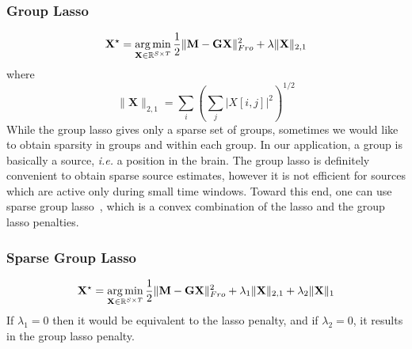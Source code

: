 \subsubsection*{Group Lasso}
\vspace{-10pt}
\begin{equation} \label{eq_glasso}
	\mathbf{X}^\star = \mathop{\mathrm{arg}\,\mathrm{min}}_{\mathbf{X}\in\mathbb{R}^{S\times T}}\frac{1}{2}\|\mathbf{M}-\mathbf{GX}\|_{Fro}^2 + \lambda\|\mathbf{X}\|_{2,1}
\end{equation}
where
\begin{equation*}	\|\mathbf{X}\|_{2,1}=\sum_i\left(\sum_j|X[i,j]|^2\right)^{1/2}
\end{equation*}
\endadjustwidth
While the group lasso gives only a sparse set of groups, sometimes we would like to obtain sparsity in groups and within each group. In our application, a group is basically a source, \textit{i.e.} a position in the brain. The group lasso is definitely convenient to obtain sparse source estimates, however it is not efficient for sources which are active only during small time windows. Toward this end, one can use sparse group lasso~\cite{simon2013sparse}, which is a convex combination of the lasso and the group lasso penalties.
\adjustwidth{1em}{0pt}

\subsubsection*{Sparse Group Lasso}
\begin{equation} \label{eq_sglasso}
	\mathbf{X}^\star = \mathop{\mathrm{arg}\,\mathrm{min}}_{\mathbf{X}\in\mathbb{R}^{S\times T}}\frac{1}{2}\|\mathbf{M}-\mathbf{GX}\|_{Fro}^2 + \lambda_1\|\mathbf{X}\|_{2,1} + \lambda_2\|\mathbf{X}\|_1
\end{equation}
If $\lambda_1=0$ then it would be equivalent to the lasso penalty, and if $\lambda_2=0$, it results in the group lasso penalty.
\endadjustwidth

